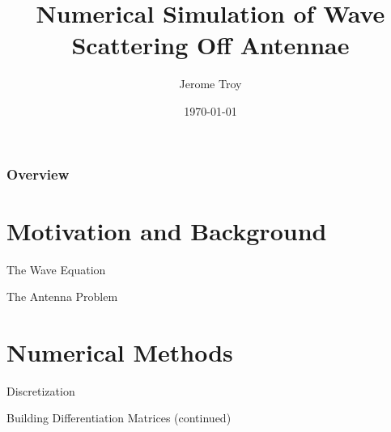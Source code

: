 \documentclass{beamer}
\title[Wave Scattering]{Numerical Simulation of Wave Scattering Off Antennae} %
\author{Jerome Troy} %
\institute[UD] %
{
University of Delaware\\ %
\medskip
}
\date{\today} %
\begin{document}
\begin{frame}
\titlepage %
\end{frame}

\begin{frame}
\frametitle{Overview} %
\tableofcontents %
\end{frame}



\section{Motivation and Background}
\begin{frame}{The Wave Equation}
    
\end{frame}


\begin{frame}{The Antenna Problem}
    
\end{frame}

\section{Numerical Methods}

\begin{frame}{Discretization}
    
\end{frame}

%    

\begin{frame}{Building Differentiation Matrices (continued)}
    
\end{frame}
\end{document}
